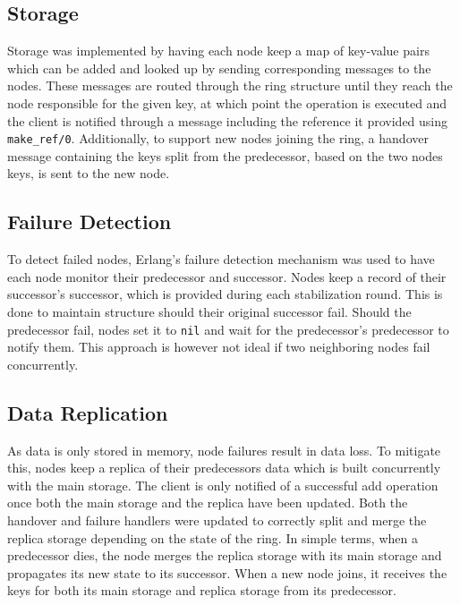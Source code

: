 \documentclass[a4paper, 11pt]{article}
\begin{document}
\subsection{Storage}

Storage was implemented by having each node keep a map of key-value pairs which can be added and looked up by sending corresponding messages to the nodes.
These messages are routed through the ring structure until they reach the node responsible for the given key,
at which point the operation is executed and the client is notified through a message including the reference it provided using \texttt{make\_ref/0}.
Additionally, to support new nodes joining the ring, a handover message containing the keys split from the predecessor, based on the two nodes keys, is sent to the new node.

\subsection{Failure Detection}

To detect failed nodes, Erlang's failure detection mechanism was used to have each node monitor their predecessor and successor.
Nodes keep a record of their successor's successor, which is provided during each stabilization round. This is done to maintain structure should their original successor fail.
Should the predecessor fail, nodes set it to \texttt{nil} and wait for the predecessor's predecessor to notify them.
This approach is however not ideal if two neighboring nodes fail concurrently.

\subsection{Data Replication}

As data is only stored in memory, node failures result in data loss. To mitigate this, nodes keep a replica of their predecessors data which is built concurrently with the main storage.
The client is only notified of a successful add operation once both the main storage and the replica have been updated.
Both the handover and failure handlers were updated to correctly split and merge the replica storage depending on the state of the ring.
In simple terms, when a predecessor dies, the node merges the replica storage with its main storage and propagates its new state to its successor.
When a new node joins, it receives the keys for both its main storage and replica storage from its predecessor.
\end{document}
